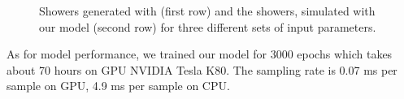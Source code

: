 \begin{figure}
  \caption{Showers generated with \geant (first row) and the showers, simulated with our model (second row) for three different sets of input parameters. }
  \label{fig:geant_vs_ours}
\end{figure}



As for model performance, we trained our model for 3000 epochs which takes about 70 hours on GPU NVIDIA Tesla K80. The sampling rate is 0.07 ms per sample on GPU, 4.9 ms per sample on CPU.
